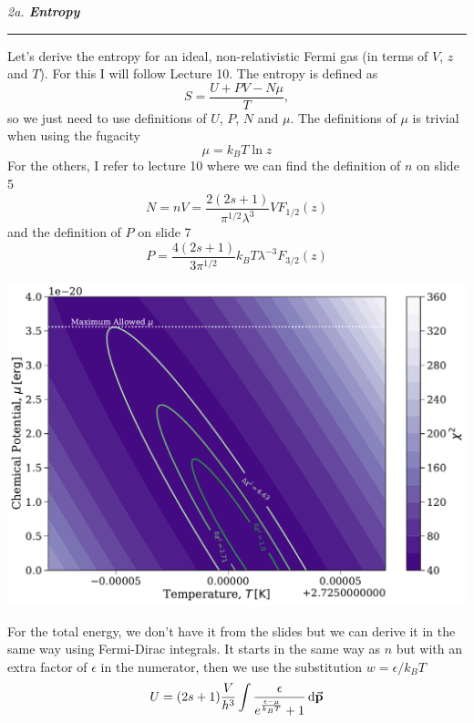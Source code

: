 \documentclass[12pt, letterpaper, twoside]{article}
\newcommand{\question}[1]{{\noindent \it #1}}
\newcommand{\answer}[1]{
    \par\noindent\rule{\textwidth}{0.4pt}#1\vspace{0.5cm}
}
\begin{document}
\question{2a. \textbf{Entropy}}
\answer{
    Let's derive the entropy for an ideal, non-relativistic Fermi gas (in terms of $V$, $z$ and $T$). For this I will follow Lecture 10. The entropy is defined as
    \begin{equation}
        S = \frac{U + PV - N \mu}{T},
    \end{equation}
    so we just need to use definitions of $U$, $P$, $N$ and $\mu$. The definitions of $\mu$ is trivial when using the fugacity
    \begin{equation}
        \mu = k_B T \ln z
    \end{equation}
    For the others, I refer to lecture 10 where we can find the definition of $n$ on slide 5
    \begin{equation}
        N = n V = \frac{2(2s + 1)}{\pi^{1/2} \lambda^3} V F_{1/2}(z)
    \end{equation}
    and the definition of $P$ on slide 7
    \begin{equation}
        P = \frac{4(2s + 1)}{3 \pi^{1/2}} k_B T \lambda^{-3} F_{3/2}(z)
    \end{equation}
    \begin{center}
        \includegraphics[width=\textwidth]{figures/max_mu.pdf}
    \end{center}
    For the total energy, we don't have it from the slides but we can derive it in the same way using Fermi-Dirac integrals. It starts in the same way as $n$ but with an extra factor of $\epsilon$ in the numerator, then we use the substitution $w = \epsilon / k_B T$
    \begin{align}
        U &= (2s + 1) \frac{V}{h^3} \int \frac{\epsilon}{e^{\frac{\epsilon - \mu}{k_B T}} + 1} \dd{\va{p}} \\

\end{align}}
\end{document}

